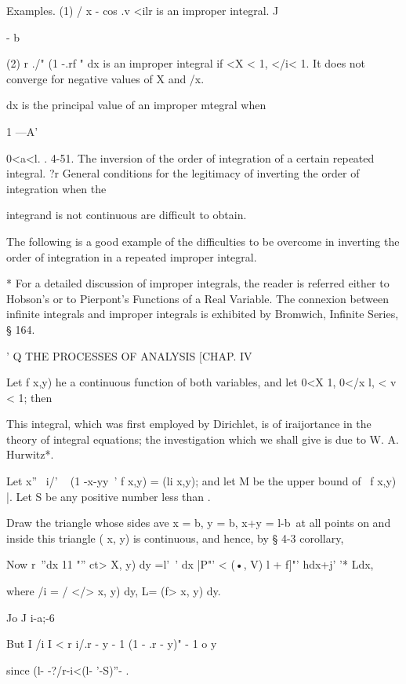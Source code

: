 Examples. (1) / x - cos .v <ilr is an improper integral. J



- b



(2) r ./" (1 -.rf " dx is an improper integral if <X < 1, </i< 1. It
does not converge for negative values of X and /x.

dx is the principal value of an improper mtegral when

1 —A'

0<a<l. . 4-51. The inversion of the order of integration of a certain
repeated integral. ?r General conditions for the legitimacy of
inverting the order of integration when the

integrand is not continuous are difficult to obtain.

The following is a good example of the difficulties to be overcome in
inverting the order of integration in a repeated improper integral.

* For a detailed discussion of improper integrals, the reader is
referred either to Hobson's or to Pierpont's Functions of a Real
Variable. The connexion between infinite integrals and improper
integrals is exhibited by Bromwich, Infinite Series, § 164.



' Q THE PROCESSES OF ANALYSIS [CHAP. IV

Let f x,y) he a continuous function of both variables, and let 0<X 1,
0</x l, < v < 1; then



This integral, which was first employed by Dirichlet, is of
iraijortance in the theory of integral equations; the investigation
which we shall give is due to W. A. Hurwitz*.

Let x''~ i/' ~ (1 -x-yy~' f x,y) = (li x,y); and let M be the upper
bound of \ f x,y) |. Let S be any positive number less than .

Draw the triangle whose sides ave x = b, y = b, x+y = l-b\ at all
points on and inside this triangle ( x, y) is continuous, and hence,
by § 4-3 corollary,

Now r~''dx 11 "'' ct> X, y) dy =l'~' dx |P"' < (•, V) l + f]"' hdx+j'
'* Ldx,

where /i = / </> x, y) dy, L= (f> x, y) dy.

Jo J i-a;-6

But I /i I < r i/.r - y - 1 (1 - .r - y)" - 1 o y

since (l- -?/r-i<(l- '-S)''- .

